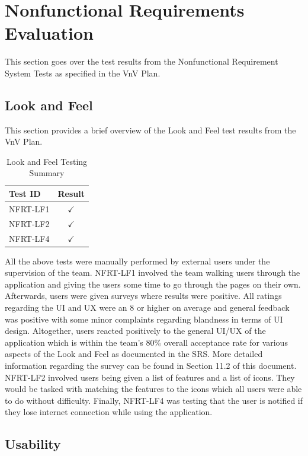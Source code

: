 \documentclass[12pt, titlepage]{article}
\begin{document}
\section{Nonfunctional Requirements Evaluation}

This section goes over the test results from the Nonfunctional Requirement System Tests as
specified in the VnV Plan.

\subsection{Look and Feel}

This section provides a brief overview of the Look and Feel test results from the VnV Plan.

\begin{longtable}{|l|c|}
  \caption{Look and Feel Testing Summary} \label{Look and Feel Testing Summary} \\
  \toprule
  \textbf{Test ID} & \textbf{Result} \\
  \midrule
  NFRT-LF1 & $\checkmark$ \\
  \midrule
  NFRT-LF2 & $\checkmark$ \\
  \midrule
  NFRT-LF4 & $\checkmark$ \\
  \bottomrule
\end{longtable}

All the above tests were manually performed by external users under the supervision of the team.
NFRT-LF1 involved the team walking users through the application and giving the users some time
to go through the pages on their own. Afterwards, users were given surveys where results
were positive. All ratings regarding the UI and UX were an 8 or higher on average and general feedback was positive
with some minor complaints regarding blandness in terms of UI design. Altogether, users reacted positively
to the general UI/UX of the application which is within the team's 80\% overall acceptance rate for various aspects
of the Look and Feel as documented in the SRS. More detailed information
regarding the survey can be found in Section 11.2 of this document. NFRT-LF2 involved users being given a list of features
and a list of icons. They would be tasked with matching the features to the icons which all users were
able to do without difficulty. Finally, NFRT-LF4 was testing that the user is notified if they lose internet
connection while using the application.

\subsection{Usability}
\end{document}
